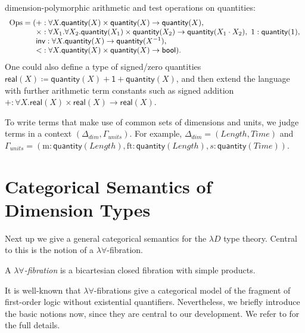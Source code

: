 \documentclass[a4paper,UKenglish]{lipics}
\theoremstyle{plain}
\newcommand{\msf}[1]{\mathsf{#1}} %
\newcommand{\unitTy}{\msf{1}}
\newcommand{\qnt}{\msf{quantity}}
\newcommand{\sreal}{\msf{real}}
\newcommand{\bool}{\msf{bool}}
\newcommand{\lengthDim}{\mathit{Length}}
\newcommand{\timeDim}{\mathit{Time}}
\newcommand{\Deltadim}{\ensuremath{\Delta_{dim}}}
\newcommand{\Gammaunits}{\ensuremath{\Gamma_{units}}}
\newcommand{\Dvar}{X}
\begin{document}
dimension-polymorphic arithmetic and test operations on quantities:
\[\begin{array}{r@{}l}\mathrm{Ops} = (
&+:\forall \Dvar. \qnt(\Dvar)\times  \qnt(\Dvar) \rightarrow \qnt(\Dvar),
\\&\times :\forall \Dvar_1. \forall \Dvar_2. \qnt(\Dvar_1)\times \qnt(\Dvar_2) \rightarrow \qnt(\Dvar_1 \cdot \Dvar_2),
\ 1:\qnt(1),
\\&\mathsf{inv}:\forall \Dvar.\qnt(\Dvar)\to \qnt (\Dvar^{-1}),
\\& {<}:\forall \Dvar.\qnt(\Dvar)\times \qnt(\Dvar)\to \bool)\text.
\end{array}\]
%
One could also define a type of signed/zero quantities $\sreal(\Dvar)\coloneqq \qnt(\Dvar)+\unitTy+\qnt(\Dvar)$, and then extend the language with further arithmetic term constants such as signed addition $+:\forall \Dvar.\sreal(\Dvar)\times \sreal(\Dvar)\to\sreal(\Dvar)$.

To write terms that make use of common sets of dimensions and units,
we judge terms in a context $(\Deltadim, \Gammaunits)$. For example,
$\Deltadim = (\lengthDim, \timeDim)$ and $\Gammaunits = (\mathrm{m} :
\qnt(\lengthDim), \mathrm{ft} : \qnt(\lengthDim), s :
\qnt(\timeDim))$.



\section{Categorical Semantics of Dimension Types} \label{sec:sem}
Next up we give a general categorical semantics for the $\lambda D$ type theory. Central to this is the notion of a $\lambda \forall$-fibration.

\begin{definition}
A \emph{$\lambda\forall$-fibration} is a bicartesian closed fibration with simple products.
\end{definition}

It is well-known that $\lambda \forall$-fibrations give a categorical model of the fragment of first-order logic without existential quantifiers. Nevertheless, we briefly introduce the basic notions now, since they are central to our development. We refer to \cite{jacobs1999categorical} for the full details.
\end{document}
